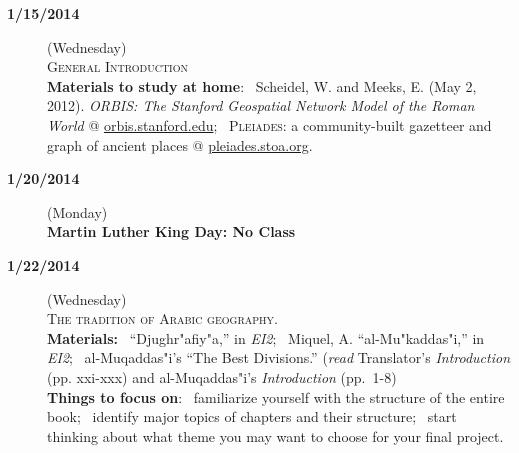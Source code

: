 \documentclass{tufte-handout} %
\begin{document}
\begin{description}

\item[\textbf{1/15/2014}](Wednesday)\\

\textsc{General Introduction}\\
\textbf{Materials to study at home}: \textbullet~Scheidel, W. and Meeks, E. (May 2, 2012). \textit{ORBIS: The Stanford Geospatial Network Model of the Roman World} @ \href{http://orbis.stanford.edu}{orbis.stanford.edu}; \textbullet~\textsc{Pleiades}: a community-built gazetteer and graph of ancient places @ \href{http://pleiades.stoa.org/}{pleiades.stoa.org}.

\noindent\hrulefill

\item[\textbf{1/20/2014}](Monday)\\
\textbf{Martin Luther King Day: No Class}

\item[\textbf{1/22/2014}](Wednesday)\\
\textsc{The tradition of Arabic geography}.\\
\textbf{Materials:}
\textbullet~``Djughr"afiy"a,'' in \textit{EI2}; \textbullet~Miquel, A. ``al-Mu"kaddas"i,'' in \textit{EI2};
\textbullet~al-Muqaddas"i's ``The Best Divisions.'' (\textit{read} Translator's \textit{Introduction} (pp. xxi-xxx) and al-Muqaddas"i's \textit{Introduction} (pp.~1-8)\\
\textbf{Things to focus on}: \textbullet~familiarize yourself with the structure of the entire book; \textbullet~identify major topics of chapters and their structure; \textbullet~start thinking about what theme you may want to choose for your final project.\\




\end{description}
\end{document}
